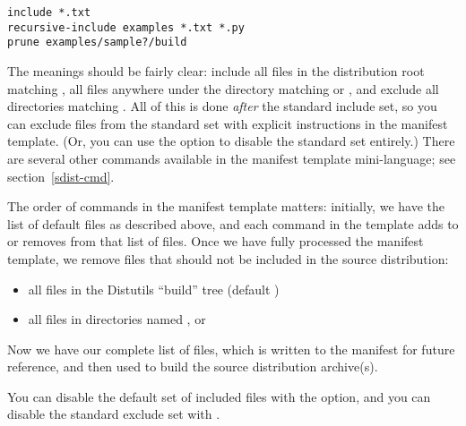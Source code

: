 \documentclass{manual}
\begin{document}
\begin{verbatim}
include *.txt
recursive-include examples *.txt *.py
prune examples/sample?/build
\end{verbatim}

The meanings should be fairly clear: include all files in the
distribution root matching , all files anywhere under the
 directory matching  or , and
exclude all directories matching .  All of
this is done \emph{after} the standard include set, so you can exclude
files from the standard set with explicit instructions in the manifest
template.  (Or, you can use the  option to
disable the standard set entirely.)  There are several other commands
available in the manifest template mini-language; see
section~\ref{sdist-cmd}.

The order of commands in the manifest template matters: initially, we
have the list of default files as described above, and each command in
the template adds to or removes from that list of files.  Once we have
fully processed the manifest template, we remove files that should not
be included in the source distribution:
\begin{itemize}
\item all files in the Distutils ``build'' tree (default )
\item all files in directories named ,  or 
\end{itemize}
Now we have our complete list of files, which is written to the manifest
for future reference, and then used to build the source distribution
archive(s).

You can disable the default set of included files with the
 option, and you can disable the standard
exclude set with .
\end{document}
